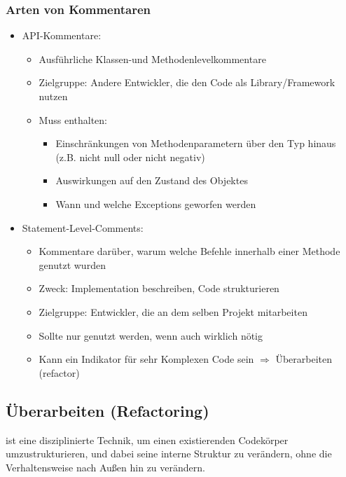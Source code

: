 \documentclass[ngerman,color=3b]{tuda_summary}
\begin{document}
\subsubsection{Arten von Kommentaren}
\begin{itemize}
    \item API-Kommentare:\begin{itemize}
              \item Ausführliche Klassen-und Methodenlevelkommentare
              \item Zielgruppe: Andere Entwickler, die den Code als Library/Framework nutzen
              \item Muss enthalten:\begin{itemize}
                        \item Einschränkungen von Methodenparametern über den Typ hinaus (z.B. nicht null oder nicht negativ)
                        \item Auswirkungen auf den Zustand des Objektes
                        \item Wann und welche Exceptions geworfen werden
                    \end{itemize}
          \end{itemize}
    \item Statement-Level-Comments:\begin{itemize}
              \item Kommentare darüber, warum welche Befehle innerhalb einer Methode genutzt wurden
              \item Zweck: Implementation beschreiben, Code strukturieren
              \item Zielgruppe: Entwickler, die an dem selben Projekt mitarbeiten
              \item Sollte nur genutzt werden, wenn auch wirklich nötig
              \item Kann ein Indikator für sehr Komplexen Code sein $\Rightarrow$ Überarbeiten (refactor)
          \end{itemize}
\end{itemize}

\clearpage
\subsection{Überarbeiten (Refactoring)}
\begin{definition}[Refactoring]
    ist eine disziplinierte Technik, um einen existierenden Codekörper umzustrukturieren, und dabei seine interne Struktur zu verändern, ohne die Verhaltensweise nach Außen hin zu verändern.
\end{definition}
\end{document}
